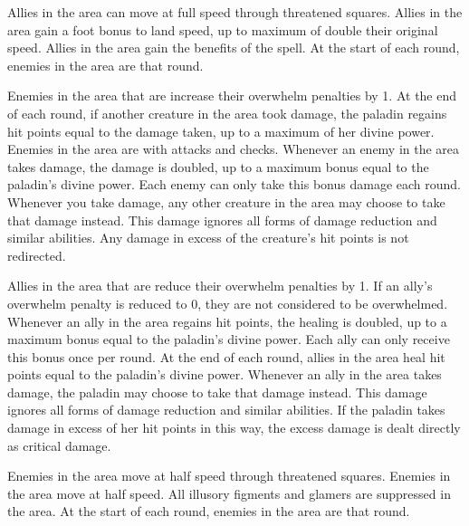 Allies in the area can move at full speed through threatened squares.
Allies in the area gain a  foot bonus to land speed, up to maximum of double their original speed.
Allies in the area gain the benefits of the  spell.
At the start of each round, enemies in the area are \disoriented that round.

Enemies in the area that are  increase their overwhelm penalties by 1.
At the end of each round, if another creature in the area took damage, the paladin regains hit points equal to the damage taken, up to a maximum of her divine power.
Enemies in the area are \impaired with attacks and checks.
Whenever an enemy in the area takes damage, the damage is doubled, up to a maximum bonus equal to the paladin's divine power.
Each enemy can only take this bonus damage each round.
Whenever you take damage, any other creature in the area may choose to take that damage instead.
This damage ignores all forms of damage reduction and similar abilities.
Any damage in excess of the creature's hit points is not redirected.

Allies in the area that are  reduce their overwhelm penalties by 1.
If an ally's overwhelm penalty is reduced to 0, they are not considered to be overwhelmed.
Whenever an ally in the area regains hit points, the healing is doubled, up to a maximum bonus equal to the paladin's divine power.
Each ally can only receive this bonus once per round.
At the end of each round, allies in the area heal hit points equal to the paladin's divine power.
Whenever an ally in the area takes damage, the paladin may choose to take that damage instead.
This damage ignores all forms of damage reduction and similar abilities.
If the paladin takes damage in excess of her hit points in this way, the excess damage is dealt directly as critical damage.

Enemies in the area move at half speed through threatened squares.
Enemies in the area move at half speed.
All illusory figments and glamers are suppressed in the area.
At the start of each round, enemies in the area are \immobilized that round.

